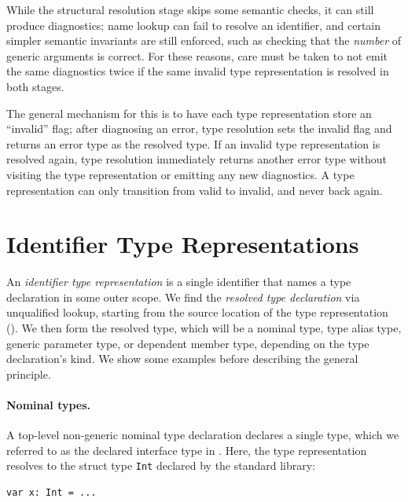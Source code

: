 \documentclass[../generics]{subfiles}
\begin{document}
While the structural resolution stage skips some semantic checks, it can still produce diagnostics; name lookup can fail to resolve an identifier, and certain simpler semantic invariants are still enforced, such as checking that the \emph{number} of generic arguments is correct. For these reasons, care must be taken to not emit the same diagnostics twice if the same invalid type representation is resolved in both stages.

The general mechanism for this is to have each type representation store an ``invalid'' flag; after diagnosing an error, type resolution sets the invalid flag and returns an error type as the resolved type. If an invalid type representation is resolved again, type resolution immediately returns another error type without visiting the type representation or emitting any new diagnostics. A type representation can only transition from valid to invalid, and never back again.

\section{Identifier Type Representations}\label{identtyperepr}

An \emph{identifier type representation} is a single identifier that names a type declaration in some outer scope. We find the \emph{resolved type declaration} via unqualified lookup, starting from the source location of the type representation (). We then form the resolved type, which will be a nominal type, type alias type, generic parameter type, or dependent member type, depending on the type declaration's kind. We show some examples before describing the general principle.

\paragraph{Nominal types.}
A top-level non-generic nominal type declaration declares a single type, which we referred to as the declared interface type in . Here, the type representation resolves to the struct type \texttt{Int} declared by the standard library:
\begin{Verbatim}
var x: Int = ...
\end{Verbatim}
\end{document}
